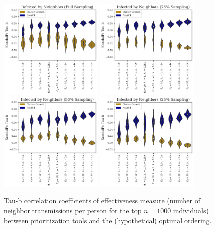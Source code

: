 \documentclass[a4paper,11pt]{article}
\begin{document}
\begin{figure}[!h]
\centering
\includegraphics[width=0.45\textwidth]{figs/results_efficacy_tau_neighbors.pdf}
\includegraphics[width=0.45\textwidth]{figs/results_efficacy_tau_neighbors_sub75.pdf}\\
\includegraphics[width=0.45\textwidth]{figs/results_efficacy_tau_neighbors_sub50.pdf}
\includegraphics[width=0.45\textwidth]{figs/results_efficacy_tau_neighbors_sub25.pdf}\\
\caption{Tau-b correlation coefficients of effectiveness measure (number of neighbor transmissions per person for the top $n=1000$ individuals) between prioritization tools and the (hypothetical) optimal ordering.}\label{fig:tau-b-values-neighbors}
\end{figure}
\end{document}
